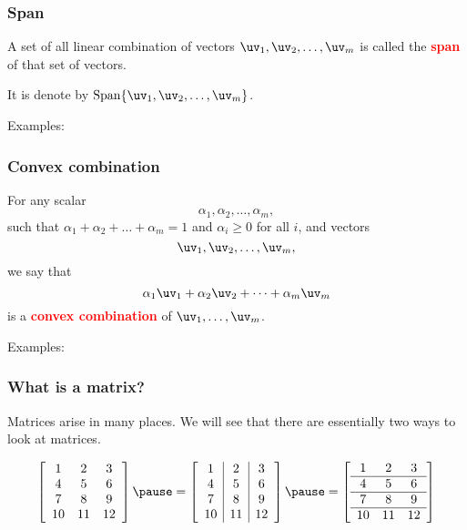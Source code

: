 \begin{frame}
  \frametitle{Span}

  A set of all linear combination of vectors $\uv_1,\uv_2,\ldots,\uv_m$ is called the \textcolor{red}{\bf span} of that set of vectors.

  It is denote by $\mathrm{Span} \{\uv_1,\uv_2,\ldots,\uv_m\}$.

  \vspace{0.3in}

  Examples:
  \vspace{2in}
\end{frame}

\begin{frame}
  \frametitle{Convex combination}
  For any scalar \
  \[
  \alpha_1,\alpha_2,\ldots,\alpha_m,
  \]
  such that $\alpha_1+\alpha_2+\ldots+\alpha_m=1$ and $\alpha_i\geq 0$ for all $i$,
  and vectors
  \[
  \uv_1,\uv_2,\ldots,\uv_m,
  \]
  we say that
  \[
  \alpha_1\uv_1 + \alpha_2\uv_2 + \cdots + \alpha_m \uv_m
  \]
  is a \textcolor{red}{\bf convex combination} of $\uv_1,\ldots,\uv_m$.
  \pause
  \vspace{0.2in}

  Examples:
  \vspace{1in}
\end{frame}


\begin{frame}
  \frametitle{What is a matrix?}

  Matrices arise in many places.  We will see that there are
  essentially two ways to look at matrices.
  
  \[
  \left[
    \begin{array}{ccc}
      1 & 2 & 3 \\
      4 & 5 & 6 \\
      7 & 8 & 9 \\
      10 & 11 & 12 \\
    \end{array}
    \right]
  \pause
  =
  \left[
    \begin{array}{c|c|c}
      1 & 2 & 3 \\
      4 & 5 & 6 \\
      7 & 8 & 9 \\
      10 & 11 & 12 \\
    \end{array}
    \right]
  \pause
  =
  \left[
    \begin{array}{ccc}
      1 & 2 & 3 \\
      \hline
      4 & 5 & 6 \\
      \hline
      7 & 8 & 9 \\
      \hline
      10 & 11 & 12 \\
    \end{array}
    \right]
  \]
\end{frame}

